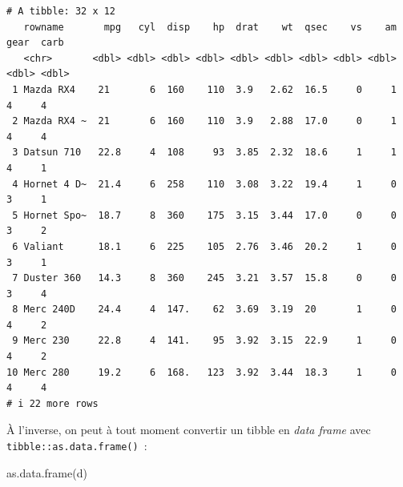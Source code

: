 \documentclass[
  letterpaper,
  DIV=11,
  numbers=noendperiod,
  oneside]{scrreprt}
\newenvironment{Shaded}{\begin{snugshade}}{\end{snugshade}}
\newcommand{\FunctionTok}[1]{\textcolor[rgb]{0.28,0.35,0.67}{#1}}
\newcommand{\NormalTok}[1]{\textcolor[rgb]{0.00,0.23,0.31}{#1}}
\begin{document}
\begin{verbatim}
# A tibble: 32 x 12
   rowname       mpg   cyl  disp    hp  drat    wt  qsec    vs    am  gear  carb
   <chr>       <dbl> <dbl> <dbl> <dbl> <dbl> <dbl> <dbl> <dbl> <dbl> <dbl> <dbl>
 1 Mazda RX4    21       6  160    110  3.9   2.62  16.5     0     1     4     4
 2 Mazda RX4 ~  21       6  160    110  3.9   2.88  17.0     0     1     4     4
 3 Datsun 710   22.8     4  108     93  3.85  2.32  18.6     1     1     4     1
 4 Hornet 4 D~  21.4     6  258    110  3.08  3.22  19.4     1     0     3     1
 5 Hornet Spo~  18.7     8  360    175  3.15  3.44  17.0     0     0     3     2
 6 Valiant      18.1     6  225    105  2.76  3.46  20.2     1     0     3     1
 7 Duster 360   14.3     8  360    245  3.21  3.57  15.8     0     0     3     4
 8 Merc 240D    24.4     4  147.    62  3.69  3.19  20       1     0     4     2
 9 Merc 230     22.8     4  141.    95  3.92  3.15  22.9     1     0     4     2
10 Merc 280     19.2     6  168.   123  3.92  3.44  18.3     1     0     4     4
# i 22 more rows
\end{verbatim}

À l'inverse, on peut à tout moment convertir un tibble en \emph{data
frame} avec \texttt{tibble::as.data.frame()}~:

\begin{Shaded}
\begin{Highlighting}[]
\FunctionTok{as.data.frame}\NormalTok{(d)}
\end{Highlighting}
\end{Shaded}
\end{document}
